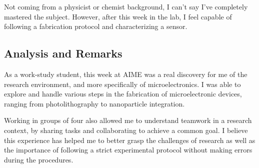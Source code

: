 Not coming from a physicist or chemist background, I can't say I've completely mastered the subject. However, after this week in the lab, I feel capable of following a fabrication protocol and characterizing a sensor.

\subsection{Analysis and Remarks}

\indent \indent As a work-study student, this week at AIME was a real discovery for me of the research environment, and more specifically of microelectronics. I was able to explore and handle various steps in the fabrication of microelectronic devices, ranging from photolithography to nanoparticle integration.

Working in groups of four also allowed me to understand teamwork in a research context, by sharing tasks and collaborating to achieve a common goal. I believe this experience has helped me to better grasp the challenges of research as well as the importance of following a strict experimental protocol without making errors during the procedures.
